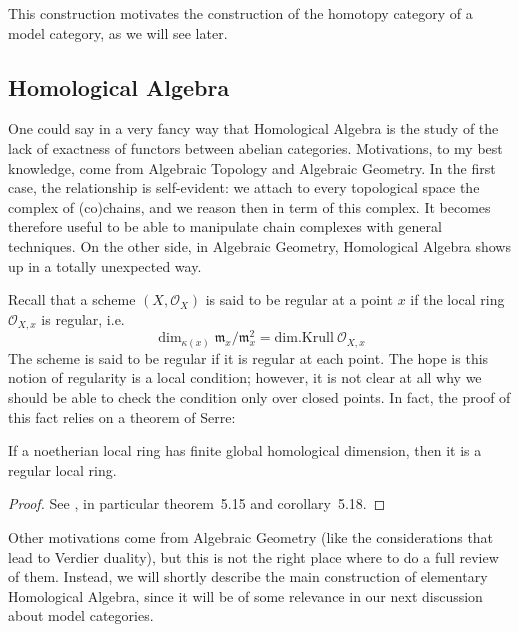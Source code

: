 \begin{refsection}
This construction motivates the construction of the homotopy category of a model category, as we will see later.

\subsection{Homological Algebra}

One could say in a very fancy way that Homological Algebra is the study of the lack of exactness of functors between abelian categories. Motivations, to my best knowledge, come from Algebraic Topology and Algebraic Geometry. In the first case, the relationship is self-evident: we attach to every topological space the complex of (co)chains, and we reason then in term of this complex. It becomes therefore useful to be able to manipulate chain complexes with general techniques. On the other side, in Algebraic Geometry, Homological Algebra shows up in a totally unexpected way.

Recall that a scheme $(X,\mathscr O_X)$ is said to be regular at a point $x$ if the local ring $\mathscr O_{X,x}$ is regular, i.e.
\[
\dim_{\kappa(x)} \mathfrak m_x / \mathfrak m_x^2 = \mathrm{dim.Krull } \: \mathscr O_{X,x}
\]
The scheme is said to be regular if it is regular at each point. The hope is this notion of regularity is a local condition; however, it is not clear at all why we should be able to check the condition only over closed points. In fact, the proof of this fact relies on a theorem of Serre:

\begin{thm} \label{thm regularity}
If a noetherian local ring has finite global homological dimension, then it is a regular local ring.
\end{thm}

\begin{proof}
  See \cite{altman-kleiman-grothendieck-duality}, in particular theorem~5.15 and corollary~5.18.%
\end{proof}

Other motivations come from Algebraic Geometry (like the considerations that lead to Verdier duality), but this is not the right place where to do a full review of them. Instead, we will shortly describe the main construction of elementary Homological Algebra, since it will be of some relevance in our next discussion about model categories.


\end{refsection}
